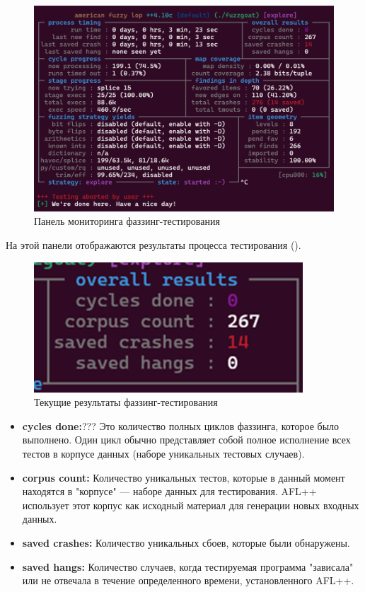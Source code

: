 \begin{figure}[ht] 
	\center
	\includegraphics [scale=1] {my_folder/images/fuzz_panel}
	\caption{Панель мониторинга фаззинг-тестирования} 
	\label{fig:fuzz-panel-ch4}  
\end{figure}

На этой панели отображаются результаты процесса тестирования ().

\begin{figure}[ht] 
	\center
	\includegraphics [scale=1] {my_folder/images/overall_res}
	\caption{Текущие результаты фаззинг-тестирования} 
	\label{fig:overall-res-ch4}  
\end{figure}

\begin{itemize}
	\item \textbf{cycles done:}??? Это количество полных циклов фаззинга, которое было выполнено. Один цикл обычно представляет собой полное исполнение всех тестов в корпусе данных (наборе уникальных тестовых случаев).
	\item \textbf{corpus count:} Количество уникальных тестов, которые в данный момент находятся в "корпусе" — наборе данных для тестирования. AFL++ использует этот корпус как исходный материал для генерации новых входных данных.
	\item \textbf{saved crashes:} Количество уникальных сбоев, которые были обнаружены.
	\item \textbf{saved hangs:} Количество случаев, когда тестируемая программа "зависала" или не отвечала в течение определенного времени, установленного AFL++.
\end{itemize}


